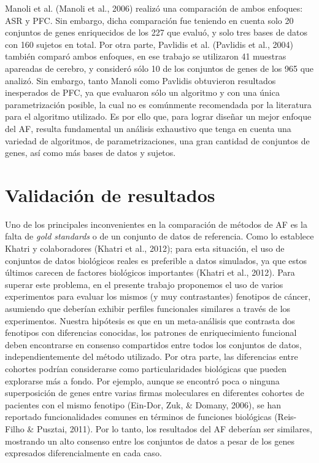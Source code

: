 \documentclass[12pt,twoside]{reedthesis}
\begin{document}
Manoli et al. (Manoli et al., 2006) realizó una comparación de ambos enfoques: ASR y PFC. Sin embargo, dicha comparación fue teniendo en cuenta solo 20 conjuntos de genes enriquecidos de los 227 que evaluó, y solo tres bases de datos con 160 sujetos en total. Por otra parte, Pavlidis et al. (Pavlidis et al., 2004) también comparó ambos enfoques, en ese trabajo se utilizaron 41 muestras apareadas de cerebro, y consideró sólo 10 de los conjuntos de genes de los 965 que analizó. Sin embargo, tanto Manoli como Pavlidis obtuvieron resultados inesperados de PFC, ya que evaluaron sólo un algoritmo y con una única parametrización posible, la cual no es comúnmente recomendada por la literatura para el algoritmo utilizado. Es por ello que, para lograr diseñar un mejor enfoque del AF, resulta fundamental un análisis exhaustivo que tenga en cuenta una variedad de algoritmos, de parametrizaciones, una gran cantidad de conjuntos de genes, así como más bases de datos y sujetos.

\hypertarget{validacion-de-resultados}{%
\section{Validación de resultados}\label{validacion-de-resultados}}

\par

Uno de los principales inconvenientes en la comparación de métodos de AF es la falta de \emph{gold standards} o de un conjunto de datos de referencia. Como lo establece Khatri y colaboradores (Khatri et al., 2012); para esta situación, el uso de conjuntos de datos biológicos reales es preferible a datos simulados, ya que estos últimos carecen de factores biológicos importantes (Khatri et al., 2012). Para superar este problema, en el presente trabajo proponemos el uso de varios experimentos para evaluar los mismos (y muy contrastantes) fenotipos de cáncer, asumiendo que deberían exhibir perfiles funcionales similares a través de los experimentos. Nuestra hipótesis es que en un meta-análisis que contrasta dos fenotipos con diferencias conocidas, los patrones de enriquecimiento funcional deben encontrarse en consenso compartidos entre todos los conjuntos de datos, independientemente del método utilizado. Por otra parte, las diferencias entre cohortes podrían considerarse como particularidades biológicas que pueden explorarse más a fondo. Por ejemplo, aunque se encontró poca o ninguna superposición de genes entre varias firmas moleculares en diferentes cohortes de pacientes con el mismo fenotipo (Ein-Dor, Zuk, \& Domany, 2006), se han reportado funcionalidades comunes en términos de funciones biológicas (Reis-Filho \& Pusztai, 2011). Por lo tanto, los resultados del AF deberían ser similares, mostrando un alto consenso entre los conjuntos de datos a pesar de los genes expresados diferencialmente en cada caso.
\end{document}
